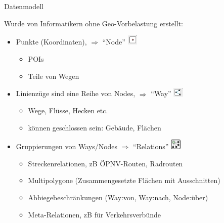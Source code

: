 \documentclass{beamer}
\begin{document}
\begin{frame}{Datenmodell}

Wurde von Informatikern ohne Geo-Vorbelastung erstellt:
\begin{itemize}
  \item Punkte (Koordinaten), $\Rightarrow$ ``Node'' \includegraphics[width=0.5cm]{node.png}
	\begin{itemize}
          \item POIs
\pause
\item Teile von Wegen
\end{itemize}
  \item Linienzüge sind eine Reihe von Nodes, $\Rightarrow$ ``Way'' \includegraphics[width=0.5cm]{way.png}
	\begin{itemize}
	  \item Wege, Flüsse, Hecken etc.
	\item können geschlossen sein: Gebäude, Flächen
\end{itemize}
\pause
  \item Gruppierungen von Ways/Nodes $\Rightarrow$ ``Relations'' \includegraphics[width=0.5cm]{relation.png}
	\begin{itemize}
          \item Streckenrelationen, zB ÖPNV-Routen, Radrouten
	\item Multipolygone (Zusammengesetzte Flächen mit Ausschnitten)
	\item Abbiegebeschränkungen (Way:von, Way:nach, Node:über)
	\item Meta-Relationen, zB für Verkehrsverbünde
	\end{itemize}
\end{itemize}

\end{frame}
\end{document}

